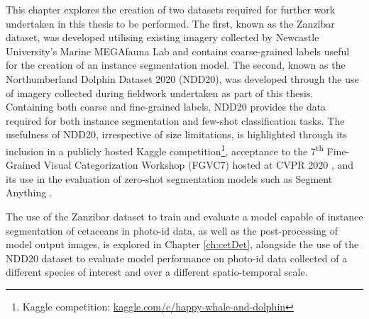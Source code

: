 This chapter explores the creation of two datasets required for further work undertaken in this thesis to be performed. The first, known as the Zanzibar dataset, was developed utilising existing imagery collected by Newcastle University's Marine MEGAfauna Lab and contains coarse-grained labels useful for the creation of an instance segmentation model. The second, known as the Northumberland Dolphin Dataset 2020 (NDD20), was developed through the use of imagery collected during fieldwork undertaken as part of this thesis. Containing both coarse and fine-grained labels, NDD20 provides the data required for both instance segmentation and few-shot classification tasks. The usefulness of NDD20, irrespective of size limitations, is highlighted through its inclusion in a publicly hosted Kaggle competition\footnote{Kaggle competition: \href{https://www.kaggle.com/c/happy-whale-and-dolphin/}{kaggle.com/c/happy-whale-and-dolphin}}, acceptance to the 7\textsuperscript{th} Fine-Grained Visual Categorization Workshop (FGVC7) hosted at CVPR 2020 \cite{trotter_ndd20_2020}, and its use in the evaluation of zero-shot segmentation models such as Segment Anything \cite{kirillov_segment_2023}. 

The use of the Zanzibar dataset to train and evaluate a model capable of instance segmentation of cetaceans in photo-id data, as well as the post-processing of model output images, is explored in Chapter \ref{ch:cetDet}, alongside the use of the NDD20 dataset to evaluate model performance on photo-id data collected of a different species of interest and over a different spatio-temporal scale.
